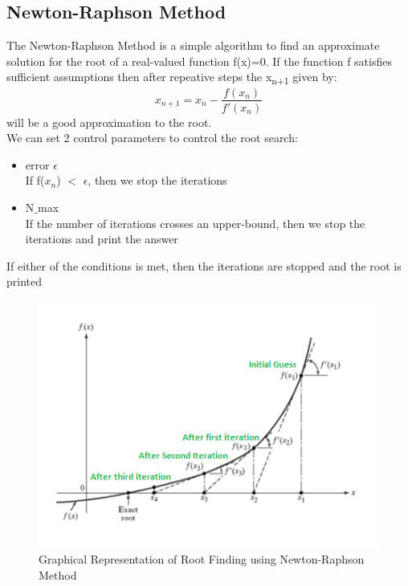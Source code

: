 \documentclass[11pt]{article}
\begin{document}
\pagebreak
\subsection{Newton-Raphson Method}
The Newton-Raphson Method is a simple algorithm to find an approximate solution for the root of a real-valued function f(x)=0. If the function f satisfies sufficient assumptions then after repeative steps the x\textsubscript{n+1} given by:\[x_{n+1} = x_n -\frac{f(x_n)}{f'(x_n)}\] will be a good approximation to the root.\\

We can set 2 control parameters to control the root search:
\begin{itemize}
	\item error $\epsilon$ \\
	If f($x_n$) $<$ $\epsilon$, then we stop the iterations
	\item N$\_$max \\
	If the number of iterations crosses an upper-bound, then we stop the iterations and print the answer
\end{itemize}
If either of the conditions is met, then the iterations are stopped and the root is printed

\begin{figure}[h!]
	\centering
	\centering
	\includegraphics[width=0.8\linewidth]{nrm1}
	\caption{Graphical Representation of Root Finding using Newton-Raphson Method}
	\label{fig2}
\end{figure}
\vspace{1cm}
\end{document}
